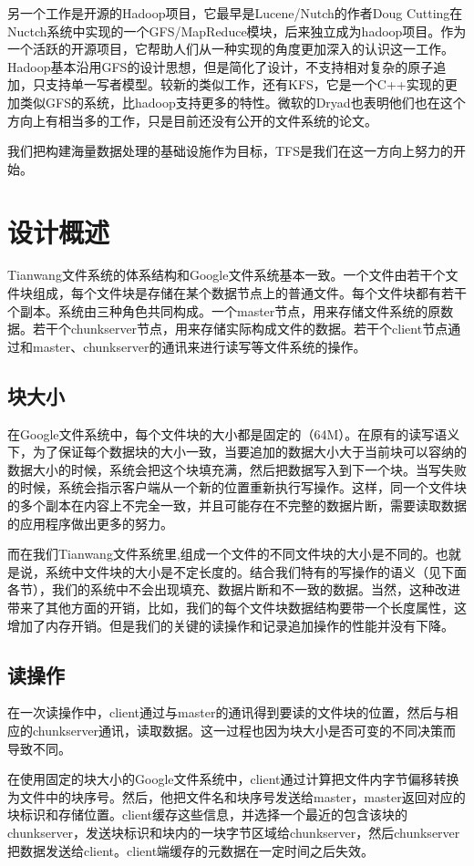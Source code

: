 \documentclass[11pt,a4paper]{scrartcl} %
\begin{document}
\begin{CJK*}{UTF8}{gbsn}
另一个工作是开源的Hadoop项目\cite{hadoop}，它最早是Lucene/Nutch的作者Doug Cutting在Nuctch系统中实现的一个GFS/MapReduce模块，后来独立成为hadoop项目。作为一个活跃的开源项目，它帮助人们从一种实现的角度更加深入的认识这一工作。Hadoop基本沿用GFS的设计思想，但是简化了设计，不支持相对复杂的原子追加，只支持单一写者模型。较新的类似工作，还有KFS\cite{kfs}，它是一个C++实现的更加类似GFS的系统，比hadoop支持更多的特性。微软的Dryad\cite{Dryad2007}也表明他们也在这个方向上有相当多的工作，只是目前还没有公开的文件系统的论文。

我们把构建海量数据处理的基础设施作为目标，TFS是我们在这一方向上努力的开始。
\section{设计概述}
Tianwang文件系统的体系结构和Google文件系统基本一致。一个文件由若干个文件块组成，每个文件块是存储在某个数据节点上的普通文件。每个文件块都有若干个副本。系统由三种角色共同构成。一个master节点，用来存储文件系统的原数据。若干个chunkserver节点，用来存储实际构成文件的数据。若干个client节点通过和master、chunkserver的通讯来进行读写等文件系统的操作。
\subsection{块大小}
在Google文件系统中，每个文件块的大小都是固定的（64M）。在原有的读写语义下，为了保证每个数据块的大小一致，当要追加的数据大小大于当前块可以容纳的数据大小的时候，系统会把这个块填充满，然后把数据写入到下一个块。当写失败的时候，系统会指示客户端从一个新的位置重新执行写操作。这样，同一个文件块的多个副本在内容上不完全一致，并且可能存在不完整的数据片断，需要读取数据的应用程序做出更多的努力。

而在我们Tianwang文件系统里,组成一个文件的不同文件块的大小是不同的。也就是说，系统中文件块的大小是不定长度的。结合我们特有的写操作的语义（见下面各节），我们的系统中不会出现填充、数据片断和不一致的数据。当然，这种改进带来了其他方面的开销，比如，我们的每个文件块数据结构要带一个长度属性，这增加了内存开销。但是我们的关键的读操作和记录追加操作的性能并没有下降。
\subsection{读操作}
在一次读操作中，client通过与master的通讯得到要读的文件块的位置，然后与相应的chunkserver通讯，读取数据。这一过程也因为块大小是否可变的不同决策而导致不同。

在使用固定的块大小的Google文件系统中，client通过计算把文件内字节偏移转换为文件中的块序号。然后，他把文件名和块序号发送给master，master返回对应的块标识和存储位置。client缓存这些信息，并选择一个最近的包含该块的chunkserver，发送块标识和块内的一块字节区域给chunkserver，然后chunkserver把数据发送给client。client端缓存的元数据在一定时间之后失效。


\end{CJK*}
\end{document}

